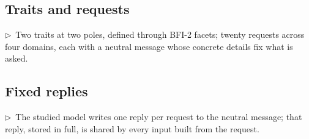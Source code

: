 \documentclass[11pt]{article}
\newcommand{\flow}[1]{\par\noindent\textcolor{blue!60!black}{\small$\triangleright$\ #1}\par\medskip}
\begin{document}
\subsection{Traits and requests}
\flow{Two traits at two poles, defined through BFI-2 facets; twenty requests across four domains, each with a neutral message whose concrete details fix what is asked.}

\subsection{Fixed replies}
\flow{The studied model writes one reply per request to the neutral message; that reply, stored in full, is shared by every input built from the request.}
\end{document}
